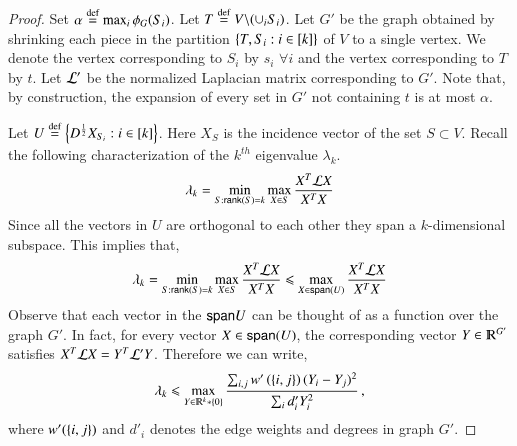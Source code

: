 \documentclass[11pt]{article}
\newcommand{\Span}{{\sf span }}
\begin{document}
\begin{proof}

Set $\alpha \stackrel{\textup{def}}{=} \max_i \phi_G(S_i)$.
Let $T \stackrel{\textup{def}}{=} V \backslash (\cup_i S_i)$.
Let $G'$ be the graph obtained by shrinking each piece in the partition
$\left\{T,S_i:i\in [k]\right\}$ of $V$ to a single vertex. We denote the vertex corresponding
to $S_i$ by $s_i$ $\forall i$ and the vertex  corresponding to $T$ by $t$. Let $\mathcal L'$
be the normalized Laplacian matrix corresponding to $G'$.
Note that, by construction, the expansion of every set in $G'$ not containing $t$
is at most $\alpha$.

Let $U \stackrel{\textup{def}}{=} \left\{D^{\frac{1}{2}} X_{S_i} : i \in [k]\right\}$. Here $X_S$ is the incidence
vector of the set $S \subset V$.  Recall the following characterization of the
$k^{th}$ eigenvalue $\lambda_k$.
\[ \lambda_{k}  =  \min_{S : {\sf rank}(S) = k} \max_{X \in S} \frac{X^T
\mathcal L X}{X^T X} \]
Since all the vectors in $U$ are orthogonal to each other they span a
$k$-dimensional subspace.  This implies that,
\[ \lambda_{k}  =  \min_{S : \rank(S) = k} \max_{X \in S} \frac{X^T \cL X}{X^T X}
	\leq  \max_{X \in \Span(U)} \frac{X^T \cL X}{X^T X} \]
	Observe that each vector in the $\Span{U}$ can be thought of
	as a function over the graph $G'$.  In fact, for every vector
	$X \in \Span(U)$, the corresponding vector $Y \in \R^{G'}$
	satisfies $X^T \mathcal L X = Y^T \mathcal L' Y$.  Therefore we can write,
	\begin{equation} \label{eq:shrunkray}
	\lambda_k \leq  \max_{ Y \in \R^k * \set{0}} \frac{ \sum_{i,j} w'
	\paren{\set{ i,j}} (Y_i - Y_j)^2 }{ \sum_i d_i' Y_i^2 } \mcom 
\end{equation}
	where $w'(\left\{i,j\right\})$ and $d'_i$ denotes the edge weights and
	degrees in graph $G'$.


\end{proof}
\end{document}
